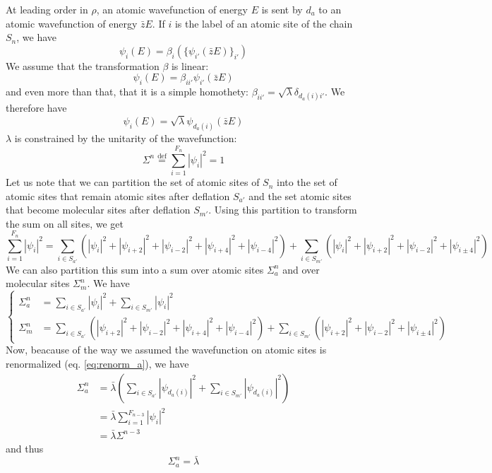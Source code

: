 \documentclass[11pt]{article}
\newcommand{\define}{\ensuremath{ \overset{\text{def}}{=} }}
\begin{document}
At leading order in $\rho$, an atomic wavefunction of energy $E$ is sent by $d_a$ to an atomic wavefunction of energy $\bar z E$.
If $i$ is the label of an atomic site of the chain $S_n$, we have
\begin{equation}
	\psi_i(E)  = \beta_i\left(\{ \psi_{i'}(\bar z E) \}_{i'}\right)
\end{equation} 
We assume that the transformation $\beta$ is linear:
\begin{equation}
	\psi_i(E)  = \beta_{ii'}  \psi_{i'}(\bar z E)
\end{equation}
and even more than that, that it is a simple homothety: $\beta_{ii'} = \sqrt{\lambda} \delta_{d_a(i)i'}$.
We therefore have
\begin{equation}
\label{eq:renorm_a}
	\psi_i(E) = \sqrt{\lambda} \psi_{d_a(i)}(\bar z E)
\end{equation}
$\lambda$ is constrained by the unitarity of the wavefunction:
\begin{equation}
	\Sigma^n \define \sum_{i=1}^{F_n} |\psi_i|^2 = 1
\end{equation}
Let us note that we can partition the set of atomic sites of $S_n$ into the set of atomic sites that remain atomic sites after deflation $S_{a'}$ and the set atomic sites that become molecular sites after deflation $S_{m'}$.
Using this partition to transform the sum on all sites, we get
\begin{equation}
	\sum_{i=1}^{F_n} |\psi_i|^2 = \sum_{i \in S_{a'}} \left( |\psi_i|^2 + |\psi_{i+2}|^2 + |\psi_{i-2}|^2 + |\psi_{i+4}|^2 + |\psi_{i-4}|^2 \right) + \sum_{i \in S_{m'}} \left( |\psi_i|^2 + |\psi_{i+2}|^2 + |\psi_{i-2}|^2 + |\psi_{i\pm4}|^2 \right)
\end{equation}
We can also partition this sum into a sum over atomic sites $\Sigma^n_a$ and over molecular sites $\Sigma^n_m$.
We have
\begin{equation}
	\begin{cases}
	\Sigma^n_a &= \sum_{i \in S_{a'}}  |\psi_i|^2  + \sum_{i \in S_{m'}}  |\psi_i|^2\\
	\Sigma^n_m &= \sum_{i \in S_{a'}} \left( |\psi_{i+2}|^2 + |\psi_{i-2}|^2 + |\psi_{i+4}|^2 + |\psi_{i-4}|^2 \right) + \sum_{i \in S_{m'}} \left(|\psi_{i+2}|^2 + |\psi_{i-2}|^2 + |\psi_{i\pm4}|^2 \right)
	\end{cases}
\end{equation}
Now, beacause of the way we assumed the wavefunction on atomic sites is renormalized (eq. \eqref{eq:renorm_a}), we have
\begin{align}
	\Sigma_a^n &= \bar \lambda  \left(  \sum_{i \in S_{a'}}  |\psi_{d_a(i)}|^2  + \sum_{i \in S_{m'}}  |\psi_{d_a(i)}|^2 \right) \\
	&= \bar \lambda \sum_{i = 1}^{F_{n-3}} |\psi_i|^2 \\
	&= \bar \lambda \Sigma^{n-3}
\end{align}
and thus
\begin{equation}
\label{eq:renorm_aa}
\boxed{
	\Sigma_a^n = \bar \lambda
	}
\end{equation}
\end{document}
